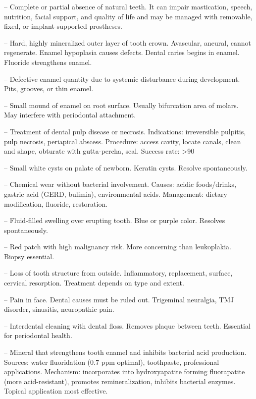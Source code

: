 -- Complete or partial absence of natural teeth. It can impair mastication, speech, nutrition, facial support, and quality of life and may be managed with removable, fixed, or implant-supported prostheses.

-- Hard, highly mineralized outer layer of tooth crown. Avascular, aneural, cannot regenerate. Enamel hypoplasia causes defects. Dental caries begins in enamel. Fluoride strengthens enamel.

-- Defective enamel quantity due to systemic disturbance during development. Pits, grooves, or thin enamel.

-- Small mound of enamel on root surface. Usually bifurcation area of molars. May interfere with periodontal attachment.

-- Treatment of dental pulp disease or necrosis. Indications: irreversible pulpitis, pulp necrosis, periapical abscess. Procedure: access cavity, locate canals, clean and shape, obturate with gutta-percha, seal. Success rate: >90%

-- Small white cysts on palate of newborn. Keratin cysts. Resolve spontaneously.

-- Chemical wear without bacterial involvement. Causes: acidic foods/drinks, gastric acid (GERD, bulimia), environmental acids. Management: dietary modification, fluoride, restoration.

-- Fluid-filled swelling over erupting tooth. Blue or purple color. Resolves spontaneously.

-- Red patch with high malignancy risk. More concerning than leukoplakia. Biopsy essential.

-- Loss of tooth structure from outside. Inflammatory, replacement, surface, cervical resorption. Treatment depends on type and extent.

-- Pain in face. Dental causes must be ruled out. Trigeminal neuralgia, TMJ disorder, sinusitis, neuropathic pain.

-- Interdental cleaning with dental floss. Removes plaque between teeth. Essential for periodontal health.

-- Mineral that strengthens tooth enamel and inhibits bacterial acid production. Sources: water fluoridation (0.7 ppm optimal), toothpaste, professional applications. Mechanism: incorporates into hydroxyapatite forming fluorapatite (more acid-resistant), promotes remineralization, inhibits bacterial enzymes. Topical application most effective.

